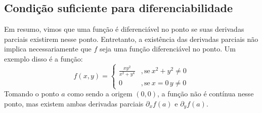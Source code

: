 \subsection{Condição suficiente para diferenciabilidade} 

Em resumo, vimos que uma função é diferenciável no ponto se suas derivadas parciais existirem nesse ponto. Entretanto, a existência das derivadas parciais não implica necessariamente que $f$ seja uma função diferenciável no ponto. Um exemplo disso é a função:
%
\[
f(x,y) = \begin{cases} 
	\frac{xy^2}{x^2 + y^4} &, \text{se} \ x^2 + y^2 \neq 0 \\ 
	0                    &, \text{se} \  x = 0 \, y\neq 0 
\end{cases}
\]
%
Tomando o ponto $a$ como sendo a origem $(0,0)$, a função não é contínua nesse ponto, mas existem ambas derivadas parciais $\partial_x f(a)$ e $\partial_y f(a)$. 












